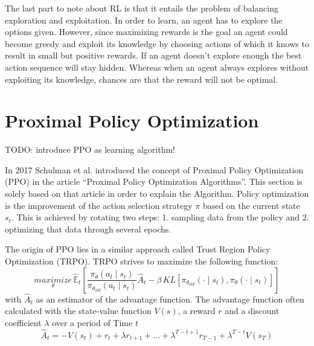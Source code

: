The last part to note about RL is that it entails the problem of balancing exploration and exploitation. In order to learn, an agent has to explore the options given. However, since maximizing rewards is the goal an agent could become greedy and exploit its knowledge by choosing actions of which it knows to result in small but positive rewards. If an agent doesn't explore enough the best action sequence will stay hidden. Whereas when an agent always explores without exploiting its knowledge, chances are that the reward will not be optimal.

\section{Proximal Policy Optimization}
TODO: introduce PPO as learning algorithm!

In 2017 Schulman et al. introduced the concept of Proximal Policy Optimization (PPO) in
the article ``Proximal Policy Optimization Algorithms''\cite{scwo17}.
This section is solely based on that article in order to explain the Algorithm.
Policy optimization is the improvement of the action selection strategy $\pi$ based on the
current state $s_{t}$. This is achieved by rotating two steps: 1. sampling data from the policy and 2.
optimizing that data through several epochs.

The origin of PPO lies in a similar approach called Trust Region Policy Optimization (TRPO).
TRPO strives to maximize the following function:
\begin{equation}\label{TRPO}
    \underset{\theta}{maximize}\,\hat{\mathbb{E}}_{t} [\frac{\pi_{\theta}(a_{t} \mid s_{t})}{\pi_{\theta_{old}}(a_{t} \mid s_{t})}
    \hat{A}_{t}-\beta \, KL[\pi_{\theta_{old}}(\cdot \mid s_{t}),\pi_{\theta}(\cdot \mid s_{t})]]
\end{equation}
with $\hat{A}_{t}$ as an estimator of the advantage function. The advantage function often calculated with the
state-value function $V(s)$, a reward $r$ and a discount coefficient $\lambda$ over a period of Time $t$
\begin{equation}\label{advantage}
    \hat{A}_{t} = -V(s_{t})+r_{t}+\lambda r_{t+1}+ \ldots + \lambda^{T-t+1} r_{T-1} + \lambda^{T-t} V(s_{T})
\end{equation}

